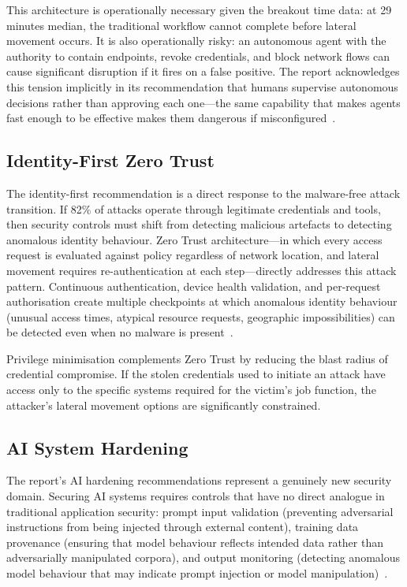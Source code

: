 \documentclass[journal]{IEEEtran}
\begin{document}
This architecture is operationally necessary given the breakout time data: at 29
minutes median, the traditional workflow cannot complete before lateral movement
occurs. It is also operationally risky: an autonomous agent with the authority to
contain endpoints, revoke credentials, and block network flows can cause significant
disruption if it fires on a false positive. The report acknowledges this tension
implicitly in its recommendation that humans supervise autonomous decisions rather
than approving each one---the same capability that makes agents fast enough to be
effective makes them dangerous if misconfigured~\cite{cs2026press}.

\subsection{Identity-First Zero Trust}

The identity-first recommendation is a direct response to the malware-free attack
transition. If 82\% of attacks operate through legitimate credentials and tools,
then security controls must shift from detecting malicious artefacts to detecting
anomalous identity behaviour. Zero Trust architecture---in which every access request
is evaluated against policy regardless of network location, and lateral movement
requires re-authentication at each step---directly addresses this attack pattern.
Continuous authentication, device health validation, and per-request authorisation
create multiple checkpoints at which anomalous identity behaviour (unusual access
times, atypical resource requests, geographic impossibilities) can be detected even
when no malware is present~\cite{cs2026press}.

Privilege minimisation complements Zero Trust by reducing the blast radius of
credential compromise. If the stolen credentials used to initiate an attack have
access only to the specific systems required for the victim's job function, the
attacker's lateral movement options are significantly constrained.

\subsection{AI System Hardening}

The report's AI hardening recommendations represent a genuinely new security domain.
Securing AI systems requires controls that have no direct analogue in traditional
application security: prompt input validation (preventing adversarial instructions
from being injected through external content), training data provenance (ensuring
that model behaviour reflects intended data rather than adversarially manipulated
corpora), and output monitoring (detecting anomalous model behaviour that may
indicate prompt injection or model manipulation)~\cite{cs2026press}.
\end{document}
